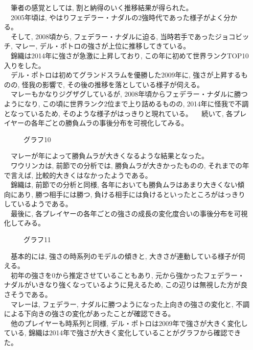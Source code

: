 \documentclass[uplatex,9pt,a5j]{jsarticle}
\begin{document}
　筆者の感覚としては, 割と納得のいく推移結果が得られた。 \\
　2005年頃は, やはりフェデラー・ナダルの2強時代であった様子がよく分かる。 \\
　そして, 2008頃から, フェデラー・ナダルに迫る, 当時若手であったジョコビッチ, マレー, デル・ポトロの強さが上位に推移してきている。\\
　錦織は2014年に強さが急激に上昇しており, この年に初めて世界ランクTOP10入りをした。\\
　デル・ポトロは初めてグランドスラムを優勝した2009年に, 強さが上昇するものの, 怪我の影響で, その後の推移を落としている様子が伺える。\\
　マレーもかなりジグザグしているが, 2008年頃からフェデラー・ナダルに勝つようになり, この頃に世界ランク2位まで上り詰めるものの, 2014年に怪我で不調となっているため, そのような様子がはっきりと現れている。
　続いて, 各プレイヤーの各年ごとの勝負ムラの事後分布を可視化してみる。

\begin{figure}[htbp]
  \begin{center}
    \caption{グラフ10}
  \end{center}
\end{figure}

　マレーが年によって勝負ムラが大きくなるような結果となった。\\
　ワウリンカは, 前節での分析では, 勝負ムラが大きかったものの, それまでの年で言えば, 比較的大きくはなかったようである。\\
　錦織は, 前節での分析と同様, 各年においても勝負ムラはあまり大きくない傾向にあり, 勝つ相手には勝つ, 負ける相手には負けるといったところがはっきりしているようである。\\
　最後に, 各プレイヤーの各年ごとの強さの成長の変化度合いの事後分布を可視化してみる。

\begin{figure}[htbp]
  \begin{center}
    \caption{グラフ11}
  \end{center}
\end{figure}

　基本的には, 強さの時系列のモデルの傾きと, 大きさが連動している様子が伺える。\\
　初年の強さを0から推定させていることもあり, 元から強かったフェデラー・ナダルがいきなり強くなっているように見えるため, この辺りは無視した方が良さそうである。\\
　マレーは, フェデラー, ナダルに勝つようになった上向きの強さの変化と, 不調による下向きの強さの変化があったことが確認できる。\\
　他のプレイヤーも時系列と同様, デル・ポトロは2009年で強さが大きく変化している, 錦織は2014年で強さが大きく変化していることがグラフから確認できた。
\end{document}
